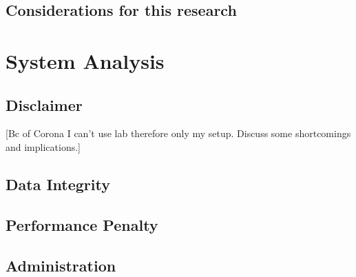 \documentclass[titlepage, a4paper, 11pt]{scrartcl}
\begin{document}

        \subsection{Considerations for this research}

    \section{System Analysis}


        \subsection{Disclaimer}

        [Bc of Corona I can't use lab therefore only my setup. Discuss some shortcomings and implications.]



        \subsection{Data Integrity}



        \subsection{Performance Penalty}



        \subsection{Administration}
\end{document}
